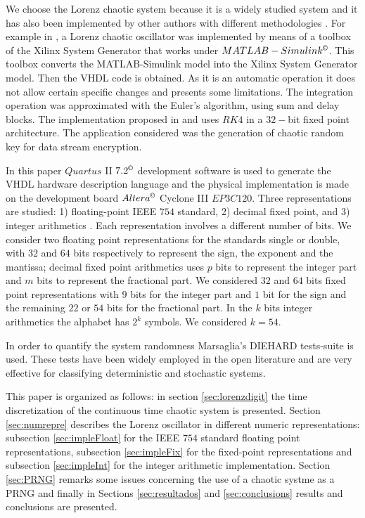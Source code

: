 We choose the Lorenz chaotic system because it is a widely studied
system and it has also been implemented by other authors  with
different methodologies \cite{Asseri2002,Azzaz2009,Azzaz2010}.
For example in \cite{Asseri2002}, a Lorenz chaotic oscillator was
implemented by means of a toolbox of the Xilinx System Generator
that works under $MATLAB-Simulink^\copyright$. This toolbox
converts the MATLAB-Simulink model into the Xilinx System
Generator model. Then the VHDL code is obtained.
As it is an automatic operation it does not allow
certain specific changes and presents some limitations.
The integration operation was approximated with the Euler's algorithm,
using sum and delay blocks. The implementation proposed in
\cite{Azzaz2009} and \cite{Azzaz2010} uses $RK4$ in a $32-$bit
fixed point architecture. The application considered was the
generation of chaotic random key for data stream encryption.

In this paper $Quartus$ II $7.2^\copyright$ development software
is used to generate the VHDL hardware description language    and
the physical implementation is made on the development board
$Altera^\copyright$ Cyclone III $EP3C120$. Three representations
are studied: 1)  floating-point IEEE $754$ standard, 2) decimal
fixed point, and 3) integer arithmetics  \cite{Gonzalez2003}. Each
representation involves a different number of bits.  We consider
two floating point representations for the standards single or
double, with $32$ and
 $64$ bits respectively to represent the sign, the exponent and the
mantissa; decimal fixed point arithmetics uses $p$ bits
to represent the integer part and $m$ bits to represent the
fractional part. We considered $32$ and $64$ bits fixed point representations with $9$ bits for the integer part and $1$ bit for the sign and the remaining $22$ or $54$ bits for the fractional part. In the $k$ bits integer arithmetics
the alphabet has $2^k$ symbols. We considered $k=54$.

In order to quantify the system randomness
Marsaglia's DIEHARD tests-suite is used. These tests have been widely employed in
the open literature and are very effective for classifying
deterministic and stochastic systems.

This paper is organized as follows: in section
\ref{sec:lorenzdigit} the time discretization of the continuous time chaotic system is
presented. Section \ref{sec:numrepre} describes the Lorenz
oscillator in different numeric representations: subsection \ref{sec:impleFloat} for the IEEE $754$ standard floating point representations, subsection \ref{sec:impleFix} for the fixed-point
representations
 and subsection \ref{sec:impleInt} for the integer
arithmetic implementation. Section \ref{sec:PRNG} remarks some
issues concerning the use of a chaotic systme as a PRNG and
finally in Sections \ref{sec:resultados} and \ref{sec:conclusions}
results and conclusions are presented.

